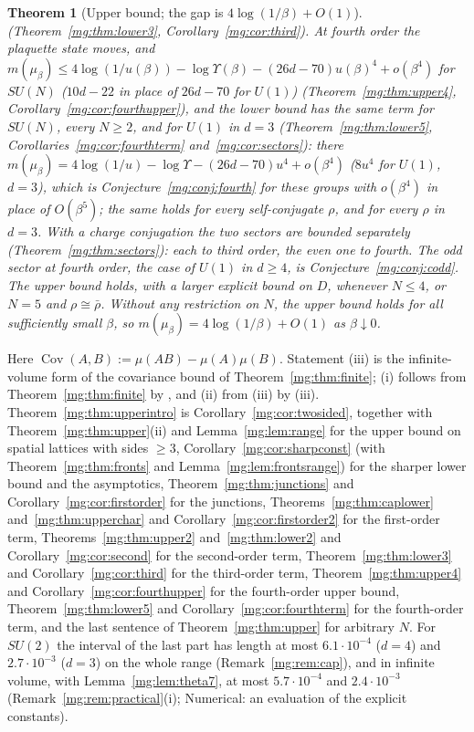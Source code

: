 \documentclass[11pt,a4paper]{article}
\newtheorem{theorem}{Theorem}[section]
\theoremstyle{definition}
\theoremstyle{remark}
\DeclareMathOperator{\Cov}{Cov}
\newcommand{\Fref}[3]{\cite[#1~`#2' (\texttt{#3})]{F}}
\newcommand{\IIref}[3]{\cite[#1~`#2' (\texttt{#3})]{II}}
\begin{document}
\begin{theorem}[Upper bound; the gap is $4\log(1/\beta)+O(1)$]
(Theorem~\ref{mg:thm:lower3}, Corollary~\ref{mg:cor:third}). At fourth order the plaquette state moves, and
$m(\mu_\beta)\le4\log(1/u(\beta))-\log\Upsilon(\beta)-(26d-70)u(\beta)^4+o(\beta^4)$ for $SU(N)$ ($10d-22$ in place of $26d-70$ for $U(1)$)
(Theorem~\ref{mg:thm:upper4}, Corollary~\ref{mg:cor:fourthupper}), and the lower bound has the same term for $SU(N)$, every $N\ge2$, and for $U(1)$ in $d=3$
(Theorem~\ref{mg:thm:lower5}, Corollaries~\ref{mg:cor:fourthterm} and~\ref{mg:cor:sectors}): there $m(\mu_\beta)=4\log(1/u)-\log\Upsilon-(26d-70)u^4+o(\beta^4)$ ($8u^4$ for $U(1)$, $d=3$), which is
Conjecture~\ref{mg:conj:fourth} for these groups with $o(\beta^4)$ in place of $O(\beta^5)$; the same holds for every self-conjugate $\rho$, and for every $\rho$ in $d=3$. With a charge
conjugation the two sectors are bounded separately (Theorem~\ref{mg:thm:sectors}): each to third order, the even one to fourth. The odd sector at fourth order,
the case of $U(1)$ in $d\ge4$, is Conjecture~\ref{mg:conj:codd}. The upper
bound holds, with a
larger explicit bound on $D$, whenever $N\le4$, or
$N=5$ and $\rho\cong\bar\rho$. Without any restriction on $N$, the
upper bound holds for all sufficiently small $\beta$, so $m(\mu_\beta)=4\log(1/\beta)+O(1)$ as $\beta\downarrow0$.
\end{theorem}

Here $\Cov(A,B):=\mu(AB)-\mu(A)\mu(B)$. Statement (iii) is the infinite-volume form of the covariance bound of
Theorem~\ref{mg:thm:finite}; (i) follows from Theorem~\ref{mg:thm:finite} by \Fref{Corollary}{Gap from Euclidean
correlations}{cor:gapfromcorr}, and (ii) from (iii) by \IIref{Theorem}{OS reconstruction of the lattice theory}{iv:thm:OS}(iii).
Theorem~\ref{mg:thm:upperintro} is Corollary~\ref{mg:cor:twosided}, together with Theorem~\ref{mg:thm:upper}(ii) and Lemma~\ref{mg:lem:range} for
the upper bound on spatial lattices with sides $\ge3$, Corollary~\ref{mg:cor:sharpconst} (with Theorem~\ref{mg:thm:fronts} and
Lemma~\ref{mg:lem:frontsrange}) for the sharper lower bound and the asymptotics, Theorem~\ref{mg:thm:junctions} and Corollary~\ref{mg:cor:firstorder}
for the junctions, Theorems~\ref{mg:thm:caplower} and~\ref{mg:thm:upperchar} and Corollary~\ref{mg:cor:firstorder2} for the first-order term, Theorems~\ref{mg:thm:upper2}
and~\ref{mg:thm:lower2} and Corollary~\ref{mg:cor:second} for the second-order term, Theorem~\ref{mg:thm:lower3} and Corollary~\ref{mg:cor:third}
for the third-order term, Theorem~\ref{mg:thm:upper4} and Corollary~\ref{mg:cor:fourthupper} for the fourth-order upper bound, Theorem~\ref{mg:thm:lower5} and
Corollary~\ref{mg:cor:fourthterm} for the fourth-order term, and the last sentence of Theorem~\ref{mg:thm:upper} for arbitrary $N$. For $SU(2)$ the interval of the last part has length at most $6.1\cdot10^{-4}$ ($d=4$)
and $2.7\cdot10^{-3}$ ($d=3$) on the whole range (Remark~\ref{mg:rem:cap}), and in infinite volume, with Lemma~\ref{mg:lem:theta7}, at most $5.7\cdot10^{-4}$ and $2.4\cdot10^{-3}$
(Remark~\ref{mg:rem:practical}(i); Numerical: an evaluation of the explicit constants).
\end{document}

